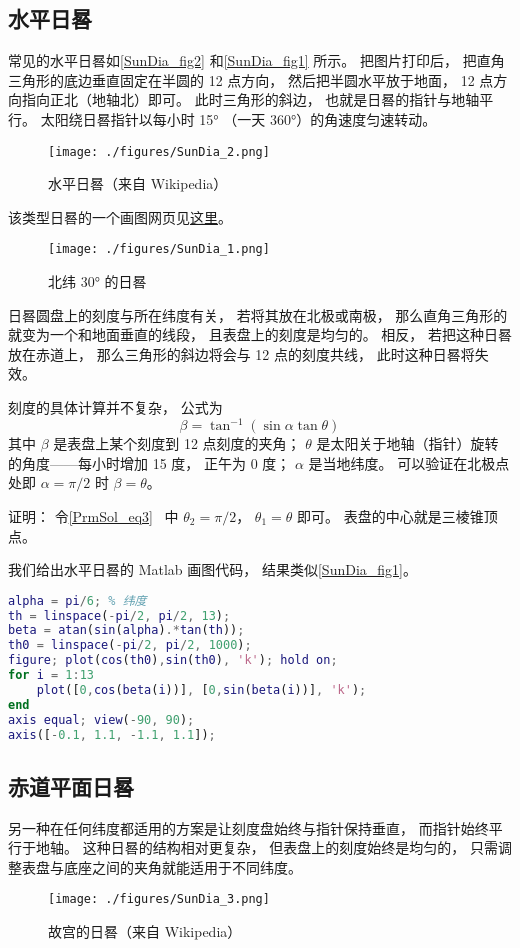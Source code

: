 
\begin{issues}
\end{issues}

\subsection{水平日晷}

常见的水平日晷如\autoref{SunDia_fig2} 和\autoref{SunDia_fig1} 所示。 把图片打印后， 把直角三角形的底边垂直固定在半圆的 12 点方向， 然后把半圆水平放于地面， 12 点方向指向正北（地轴北）即可。 此时三角形的斜边， 也就是日晷的指针与地轴平行。 太阳绕日晷指针以每小时 15° （一天 360°）的角速度匀速转动。

\begin{figure}[ht]
\centering
\texttt{[image: ./figures/SunDia\_2.png]}
\caption{水平日晷（来自 Wikipedia）} \label{SunDia_fig2}
\end{figure}
该类型日晷的一个画图网页见\href{https://www.blocklayer.com/sundial.aspx}{这里}。
\begin{figure}[ht]
\centering
\texttt{[image: ./figures/SunDia\_1.png]}
\caption{北纬 30° 的日晷} \label{SunDia_fig1}
\end{figure}

日晷圆盘上的刻度与所在纬度有关， 若将其放在北极或南极， 那么直角三角形的就变为一个和地面垂直的线段， 且表盘上的刻度是均匀的。 相反， 若把这种日晷放在赤道上， 那么三角形的斜边将会与 12 点的刻度共线， 此时这种日晷将失效。

刻度的具体计算并不复杂， 公式为
\begin{equation}
\beta = \tan^{-1}(\sin\alpha \tan \theta)
\end{equation}
其中 $\beta$ 是表盘上某个刻度到 12 点刻度的夹角； $\theta$ 是太阳关于地轴（指针）旋转的角度——每小时增加 15 度， 正午为 0 度； $\alpha$ 是当地纬度。 可以验证在北极点处即 $\alpha = \pi/2$ 时 $\beta = \theta$。

证明： 令\autoref{PrmSol_eq3}~ 中 $\theta_2 = \pi/2$， $\theta_1 = \theta$ 即可。 表盘的中心就是三棱锥顶点。

我们给出水平日晷的 Matlab 画图代码， 结果类似\autoref{SunDia_fig1}。
\begin{lstlisting}[language=matlab, caption=sunDial.m]
alpha = pi/6; % 纬度
th = linspace(-pi/2, pi/2, 13);
beta = atan(sin(alpha).*tan(th));
th0 = linspace(-pi/2, pi/2, 1000);
figure; plot(cos(th0),sin(th0), 'k'); hold on;
for i = 1:13
    plot([0,cos(beta(i))], [0,sin(beta(i))], 'k');
end
axis equal; view(-90, 90);
axis([-0.1, 1.1, -1.1, 1.1]);
\end{lstlisting}

\subsection{赤道平面日晷}
另一种在任何纬度都适用的方案是让刻度盘始终与指针保持垂直， 而指针始终平行于地轴。 这种日晷的结构相对更复杂， 但表盘上的刻度始终是均匀的， 只需调整表盘与底座之间的夹角就能适用于不同纬度。
\begin{figure}[ht]
\centering
\texttt{[image: ./figures/SunDia\_3.png]}
\caption{故宫的日晷（来自 Wikipedia）} \label{SunDia_fig3}
\end{figure}
